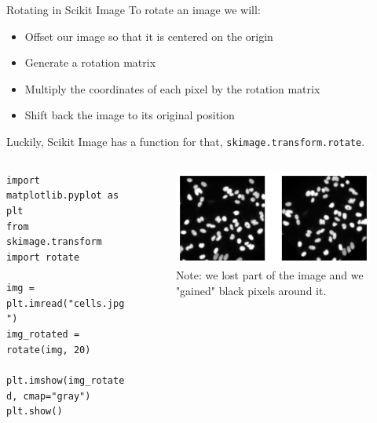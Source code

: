 \documentclass[9pt, aspectratio=169]{beamer}
\begin{document}
\begin{frame}
    {Rotating in Scikit Image}
    To rotate an image we will:
    \begin{itemize}
        \item Offset our image so that it is centered on the origin
        \item Generate a rotation matrix
        \item Multiply the coordinates of each pixel by the rotation matrix
        \item Shift back the image to its original position
    \end{itemize}
    \pause
    Luckily, Scikit Image has a function for that, \texttt{skimage.transform.rotate}.

    \begin{columns}
        \begin{column}{0.5\textwidth}
            \begin{codebox}
                \texttt{import matplotlib.pyplot as plt\\
                    from skimage.transform import rotate\\
                    \\
                    img = plt.imread("cells.jpg")\\
                    img\_rotated = rotate(img, 20)\\
                    \\
                    plt.imshow(img\_rotated, cmap="gray")\\
                    plt.show()}
            \end{codebox}
        \end{column}
        \begin{column}{0.5\textwidth}
            \begin{figure}
                \includegraphics[width=\textwidth]{rotate_image.png}
                \caption{Note: we lost part of the image and we "gained" black pixels around it.}
            \end{figure}
        \end{column}
    \end{columns}
\end{frame}
\end{document}
